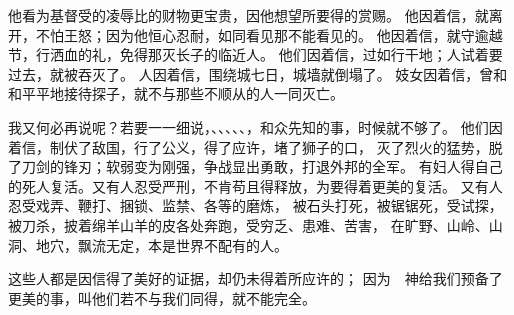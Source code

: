 {他看为基督受的凌辱比{}的财物更宝贵，因他想望所要得的赏赐。
他因着信，就离开{}，不怕王怒；因为他恒心忍耐，如同看见那不能看见的{}。
他因着信，就守逾越节，行洒血的礼，免得那灭长子的临近{}人。
他们因着信，过{}如行干地；{}人试着要过去，就被吞灭了。
人因着信，围绕{}城七日，城墙就倒塌了。
妓女{}因着信，曾和和平平地接待探子，就不与那些不顺从的人一同灭亡。
\par }{\PP {}我又何必再说呢？若要一一细说，{}、{}、{}、{}、{}、{}，和众先知的事，时候就不够了。
他们因着信，制伏了敌国，行了公义，得了应许，堵了狮子的口，
灭了烈火的猛势，脱了刀剑的锋刃；软弱变为刚强，争战显出勇敢，打退外邦的全军。
有妇人得自己的死人复活。又有人忍受严刑，不肯苟且得释放，为要得着更美的复活。
又有人忍受戏弄、鞭打、捆锁、监禁、各等的磨炼，
被石头打死，被锯锯死，受试探，被刀杀，披着绵羊山羊的皮各处奔跑，受穷乏、患难、苦害，
在旷野、山岭、山洞、地穴，飘流无定，本是世界不配有的人。
\par }{\PP {}这些人都是因信得了美好的证据，却仍未得着所应许的；
因为　神给我们预备了更美的事，叫他们若不与我们同得，就不能完全。

}
